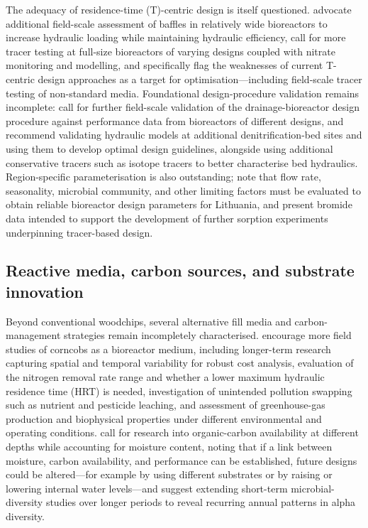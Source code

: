 The adequacy of residence-time (T)-centric design is itself questioned. \textcite{deOliveira2023} advocate additional field-scale assessment of baffles in relatively wide bioreactors to increase hydraulic loading while maintaining hydraulic efficiency, call for more tracer testing at full-size bioreactors of varying designs coupled with nitrate monitoring and modelling, and specifically flag the weaknesses of current T-centric design approaches as a target for optimisation---including field-scale tracer testing of non-standard media. Foundational design-procedure validation remains incomplete: \textcite{Christianson2013} call for further field-scale validation of the drainage-bioreactor design procedure against performance data from bioreactors of different designs, and \textcite{Ghane2015} recommend validating hydraulic models at additional denitrification-bed sites and using them to develop optimal design guidelines, alongside using additional conservative tracers such as isotope tracers to better characterise bed hydraulics. Region-specific parameterisation is also outstanding; \textcite{Povilaitis2020} note that flow rate, seasonality, microbial community, and other limiting factors must be evaluated to obtain reliable bioreactor design parameters for Lithuania, and \textcite{Ghane2019} present bromide data intended to support the development of further sorption experiments underpinning tracer-based design.

\subsection{Reactive media, carbon sources, and substrate innovation}
Beyond conventional woodchips, several alternative fill media and carbon-management strategies remain incompletely characterised. \textcite{Law2023} encourage more field studies of corncobs as a bioreactor medium, including longer-term research capturing spatial and temporal variability for robust cost analysis, evaluation of the nitrogen removal rate range and whether a lower maximum hydraulic residence time (HRT) is needed, investigation of unintended pollution swapping such as nutrient and pesticide leaching, and assessment of greenhouse-gas production and biophysical properties under different environmental and operating conditions. \textcite{Porter2015} call for research into organic-carbon availability at different depths while accounting for moisture content, noting that if a link between moisture, carbon availability, and performance can be established, future designs could be altered---for example by using different substrates or by raising or lowering internal water levels---and suggest extending short-term microbial-diversity studies over longer periods to reveal recurring annual patterns in alpha diversity.

